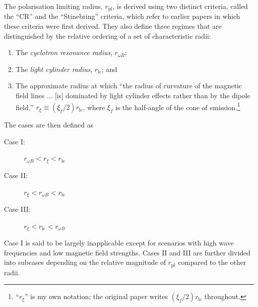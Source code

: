 \documentclass{book}
\newcommand{\rL}{r_\text{lc}} %
\newcommand{\rpl}{r_\text{pl}} %
\newcommand{\rwB}{r_{\omega B}} %
\newcommand{\rxf}{r_\xi} %
\begin{document}
The polarisation limiting radius, $\rpl$, is derived using two distinct criteria, called the ``CR'' and the ``Stinebring'' criteria, which refer to earlier papers in which these criteria were first derived.
They also define three regimes that are distinguished by the relative ordering of a set of characteristic radii:
\begin{enumerate}
    \item The \textit{cyclotron resonance radius}, $\rwB$;
    \item The \textit{light cylinder radius}, $\rL$; and
    \item The approximate radius at which ``the radius of curvature of the magnetic field lines ... [is] dominated by light cylinder effects rather than by the dipole field,'' $\rxf \equiv (\xi_f/2)\rL$, where $\xi_f$ is the half-angle of the cone of emission.\footnote{``$\rxf$'' is my own notation; the original paper writes $(\xi_f/2)\rL$ throughout.}
\end{enumerate}
The cases are then defined as
\begin{description}
    \item[Case I:] $\rwB < \rxf < \rL$
    \item[Case II:] $\rxf < \rwB < \rL$
    \item[Case III:] $\rxf < \rL < \rwB$
\end{description}
Case I is said to be largely inapplicable except for scenarios with high wave frequencies and low magnetic field strengths.
Cases II and III are further divided into subcases depending on the relative magnitude of $\rpl$ compared to the other radii.
\end{document}

